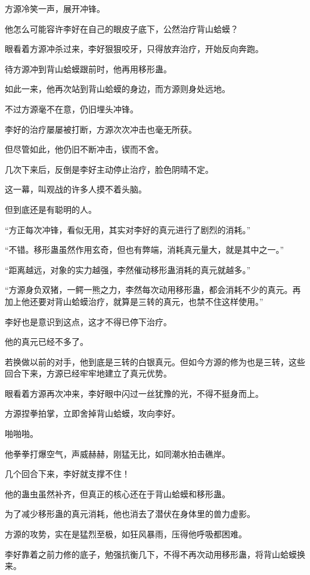 \begin{this_body}
方源冷笑一声，展开冲锋。

他怎么可能容许李好在自己的眼皮子底下，公然治疗背山蛤蟆？

眼看着方源冲杀过来，李好狠狠咬牙，只得放弃治疗，开始反向奔跑。

待方源冲到背山蛤蟆跟前时，他再用移形蛊。

如此一来，他再次站到背山蛤蟆的身边，而方源则身处远地。

不过方源毫不在意，仍旧埋头冲锋。

李好的治疗屡屡被打断，方源次次冲击也毫无所获。

但尽管如此，他仍旧不断冲击，锲而不舍。

几次下来后，反倒是李好主动停止治疗，脸色阴晴不定。

这一幕，叫观战的许多人摸不着头脑。

但到底还是有聪明的人。

“方正每次冲锋，看似无用，其实对李好的真元进行了剧烈的消耗。”

“不错。移形蛊虽然作用玄奇，但也有弊端，消耗真元量大，就是其中之一。”

“距离越远，对象的实力越强，李然催动移形蛊消耗的真元就越多。”

“方源身负双猪，一鳄一熊之力，李然每次动用移形蛊，都会消耗不少的真元。再加上他还要对背山蛤蟆治疗，就算是三转的真元，也禁不住这样使用。”

李好也是意识到这点，这才不得已停下治疗。

他的真元已经不多了。

若换做以前的对手，他到底是三转的白银真元。但如今方源的修为也是三转，这些回合下来，方源已经牢牢地建立了真元优势。

眼看着方源再次冲来，李好眼中闪过一丝犹豫的光，不得不挺身而上。

方源捏拳拍掌，立即舍掉背山蛤蟆，攻向李好。

啪啪啪。

他拳拳打爆空气，声威赫赫，刚猛无比，如同潮水拍击礁岸。

几个回合下来，李好就支撑不住！

他的蛊虫虽然补齐，但真正的核心还在于背山蛤蟆和移形蛊。

为了减少移形蛊的真元消耗，他也消去了潜伏在身体里的兽力虚影。

方源的攻势，实在是猛烈至极，如狂风暴雨，压得他呼吸都困难。

李好靠着之前力修的底子，勉强抗衡几下，不得不再次动用移形蛊，将背山蛤蟆换来。


\end{this_body}
